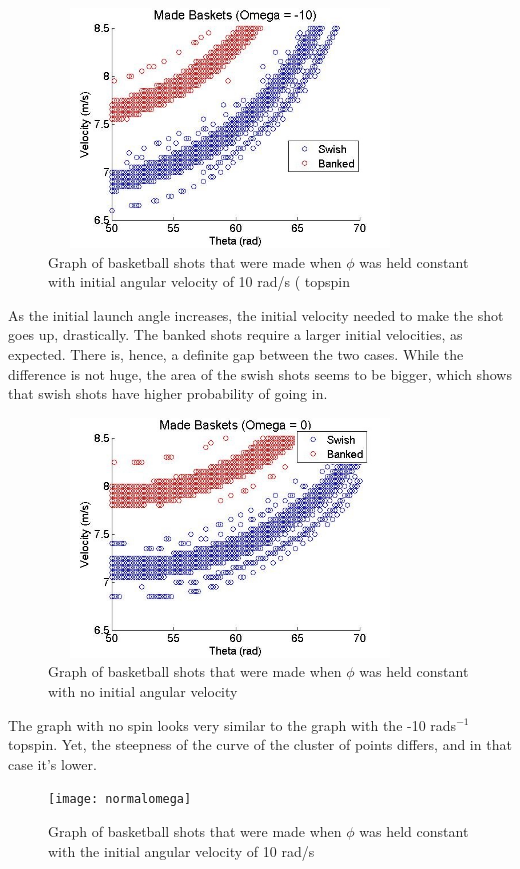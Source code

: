 \documentclass[twocolumn]{IEEEtran}
\begin{document}
\begin{figure}[!ht]
\includegraphics[height=2.5in,width = 3.8in]{topspin}
\caption{Graph of basketball shots that were made when $\phi$ was held constant with initial angular velocity of 10 rad/s ( topspin}
\end{figure}

As the initial launch angle increases, the initial velocity needed to make the shot goes up, drastically. The banked shots require a larger initial velocities, as expected. There is, hence, a definite gap between the two cases. While the difference is not huge, the area of the swish shots seems to be bigger, which shows that swish shots have higher probability of going in.

\begin{figure}[!ht]
\includegraphics[height=2.5in,width = 3.8in]{0spin}
\caption{Graph of basketball shots that were made when $\phi$ was held constant with no initial angular velocity}
\end{figure}

The graph with no spin looks very similar to the graph with the -10 rads$^{-1}$ topspin. Yet, the steepness of the curve of the cluster of points differs, and in that case it's lower.

\begin{figure}[!ht]
\texttt{[image: normalomega]}
\caption{Graph of basketball shots that were made when $\phi$ was held constant with the initial angular velocity of 10 rad/s}
\end{figure}
\end{document}
